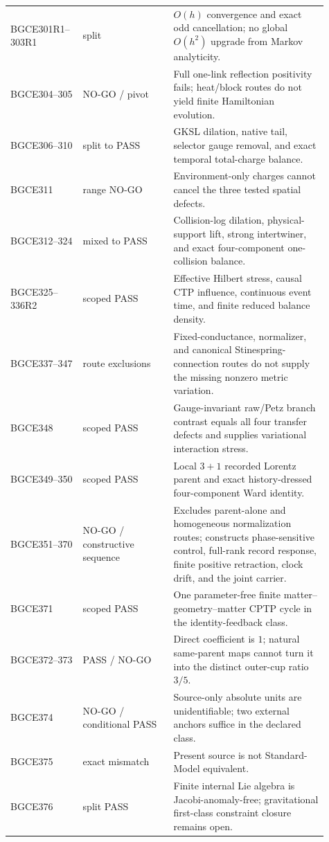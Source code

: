 \documentclass[11pt]{article}
\theoremstyle{definition}
\theoremstyle{remark}
\begin{document}
\begin{longtable}{>{\raggedright\arraybackslash}p{0.18\linewidth} >{\raggedright\arraybackslash}p{0.27\linewidth} >{\raggedright\arraybackslash}p{0.46\linewidth}}
BGCE301R1--303R1 & split & $O(h)$ convergence and exact odd cancellation; no global $O(h^2)$ upgrade from Markov analyticity. \\
BGCE304--305 & NO-GO / pivot & Full one-link reflection positivity fails; heat/block routes do not yield finite Hamiltonian evolution. \\
BGCE306--310 & split to PASS & GKSL dilation, native tail, selector gauge removal, and exact temporal total-charge balance. \\
BGCE311 & range NO-GO & Environment-only charges cannot cancel the three tested spatial defects. \\
BGCE312--324 & mixed to PASS & Collision-log dilation, physical-support lift, strong intertwiner, and exact four-component one-collision balance. \\
BGCE325--336R2 & scoped PASS & Effective Hilbert stress, causal CTP influence, continuous event time, and finite reduced balance density. \\
BGCE337--347 & route exclusions & Fixed-conductance, normalizer, and canonical Stinespring-connection routes do not supply the missing nonzero metric variation. \\
BGCE348 & scoped PASS & Gauge-invariant raw/Petz branch contrast equals all four transfer defects and supplies variational interaction stress. \\
BGCE349--350 & scoped PASS & Local $3+1$ recorded Lorentz parent and exact history-dressed four-component Ward identity. \\
BGCE351--370 & NO-GO / constructive sequence & Excludes parent-alone and homogeneous normalization routes; constructs phase-sensitive control, full-rank record response, finite positive retraction, clock drift, and the joint carrier. \\
BGCE371 & scoped PASS & One parameter-free finite matter--geometry--matter CPTP cycle in the identity-feedback class. \\
BGCE372--373 & PASS / NO-GO & Direct coefficient is $1$; natural same-parent maps cannot turn it into the distinct outer-cup ratio $3/5$. \\
BGCE374 & NO-GO / conditional PASS & Source-only absolute units are unidentifiable; two external anchors suffice in the declared class. \\
BGCE375 & exact mismatch & Present source is not Standard-Model equivalent. \\
BGCE376 & split PASS & Finite internal Lie algebra is Jacobi-anomaly-free; gravitational first-class constraint closure remains open. \\

\end{longtable}
\end{document}
